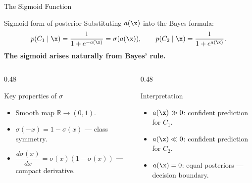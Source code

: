 \begin{frame}{The Sigmoid Function}
  \begin{block}{Sigmoid form of posterior}
    Substituting $a(\x)$ into the Bayes formula:
    \[
      p(C_1\mid\x)=\frac{1}{1+e^{-a(\x)}}=\sigma(a(\x)),
      \qquad
      p(C_2\mid\x)=\frac{1}{1+e^{a(\x)}}.
    \]
    \textbf{The sigmoid arises naturally from Bayes' rule.}
  \end{block}

  \begin{columns}[T]
    \begin{column}{0.48\textwidth}
      \begin{block}{Key properties of $\sigma$}
        \begin{itemize}
          \item Smooth map $\mathbb{R}\to(0,1)$.
          \item $\sigma(-x)=1-\sigma(x)$ — class symmetry.
          \item $\dfrac{d\sigma(x)}{dx}=\sigma(x)(1-\sigma(x))$ — compact derivative.
        \end{itemize}
      \end{block}
    \end{column}
    \begin{column}{0.48\textwidth}
      \begin{block}{Interpretation}
        \begin{itemize}
          \item $a(\x)\gg 0$: confident prediction for $C_1$.
          \item $a(\x)\ll 0$: confident prediction for $C_2$.
          \item $a(\x)=0$: equal posteriors — decision boundary.
        \end{itemize}
      \end{block}
    \end{column}
  \end{columns}
\end{frame}

